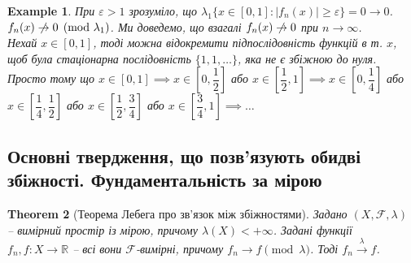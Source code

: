 \documentclass[a4paper, 10pt]{article}
\theoremstyle{theoremdd}
\newtheorem{theorem}{Theorem}[subsection]
\newtheorem{example}[theorem]{Example}
\newcommand\tomeasure[1]{\overset{{#1}}{\to}}
\begin{document}
\begin{example}
При $\varepsilon > 1$ зрозуміло, що $\lambda_1 \{x \in [0,1]: |f_n(x)| \geq \varepsilon\} = 0 \to 0$.\\
$f_n(x) \centernot\to 0 \pmod {\lambda_1}$. Ми доведемо, що взагалі $f_n(x) \centernot\to 0$ при $n \to \infty$.\\
Нехай $x \in [0,1]$, тоді можна відокремити підпослідовність функцій в т. $x$, щоб була стаціонарна послідовність $\{1,1,\dots\}$, яка не є збіжною до нуля. Просто тому що $x \in [0,1] \implies x \in \left[ 0, \dfrac{1}{2} \right]$ або $x \in \left[ \dfrac{1}{2},1 \right] \implies x \in \left[ 0, \dfrac{1}{4} \right]$ або $x \in \left[ \dfrac{1}{4},\dfrac{1}{2} \right]$ або $x \in \left[ \dfrac{1}{2},\dfrac{3}{4} \right]$ або $x \in \left[ \dfrac{3}{4},1 \right] \implies \dots$
\end{example}

\subsection{Основні твердження, що позв'язують обидві збіжності. Фундаментальність за мірою}
\begin{theorem}[Теорема Лебега про зв'язок між збіжностями]
Задано $(X,\mathcal{F},\lambda)$ -- вимірний простір із мірою, причому $\lambda(X) < +\infty$. Задані функції $f_n,f \colon X \to \mathbb{R}$ -- всі вони $\mathcal{F}$-вимірні, причому $f_n \to f \pmod \lambda$. Тоді $f_n \tomeasure{\lambda} f$.
\end{theorem}
\end{document}
